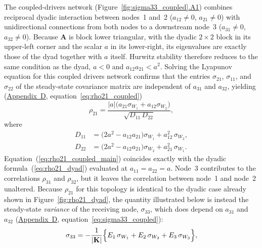 \documentclass[12pt]{article}
\begin{document}
The coupled-drivers network
(Figure~\ref{fig:sigma33_coupled}\hyperref[fig:coupled_A1]{.A1})
combines reciprocal dyadic interaction between nodes~1
and~2 ($a_{12}\neq0$, $a_{21}\neq0$) with unidirectional
connections from both nodes to a downstream node~3
($a_{31}\neq0$, $a_{32}\neq0$). Because $\mathbf{A}$ is block lower triangular, with the
dyadic $2\times2$ block in its upper-left corner and the
scalar $a$ in its lower-right, its eigenvalues are exactly
those of the dyad together with $a$ itself. Hurwitz stability
therefore reduces to the same condition as the dyad, $a<0$
and $a_{12}a_{21}<a^2$.
Solving the Lyapunov equation for this coupled drivers
network confirms that the entries $\sigma_{21}$,
$\sigma_{11}$, and $\sigma_{22}$ of the steady-state
covariance matrix are independent of $a_{31}$ and $a_{32}$,
yielding (\hyperref[app:appD]{Appendix~D},
equation~\ref{eq:rho21_coupled})
\begin{equation}
\rho_{21} = \frac{|a|\bigl(a_{21}\sigma_{W_1}+a_{12}\sigma_{W_2}\bigr)}
                 {\sqrt{D_{11}\,D_{22}}},
\label{eq:rho21_coupled_main}
\end{equation}
where
\begin{align}
D_{11} &= \bigl(2a^2-a_{12}a_{21}\bigr)\sigma_{W_1}
          + a_{12}^2\,\sigma_{W_2},
\label{eq:D11_coupled_main}\\
D_{22} &= \bigl(2a^2-a_{12}a_{21}\bigr)\sigma_{W_2}
          + a_{21}^2\,\sigma_{W_1}.
\label{eq:D22_coupled_main}
\end{align}
Equation~(\ref{eq:rho21_coupled_main}) coincides exactly with the dyadic
formula~(\ref{eq:rho21_dyad}) evaluated at
$a_{11}=a_{22}=a$. Node~3 contributes to the correlations
$\rho_{31}$ and $\rho_{32}$, but it leaves the correlation
between node~1 and node~2 unaltered.
Because $\rho_{21}$ for this topology is identical to
the dyadic case already shown in Figure~\ref{fig:rho21_dyad}, the
quantity illustrated below is instead the steady-state
\emph{variance} of the receiving node, $\sigma_{33}$, which does
depend on $a_{31}$ and $a_{32}$ (\hyperref[app:appD]{Appendix~D},
equation~\ref{eq:sigma33_coupled}):
\begin{equation}
\sigma_{33} = -\frac{1}{|\mathbf{K}|}\Bigl\{
  E_{1}\,\sigma_{W_1} + E_{2}\,\sigma_{W_2} + E_{3}\,\sigma_{W_3}
\Bigr\},
\label{eq:sigma33_coupled_main}
\end{equation}
\end{document}
